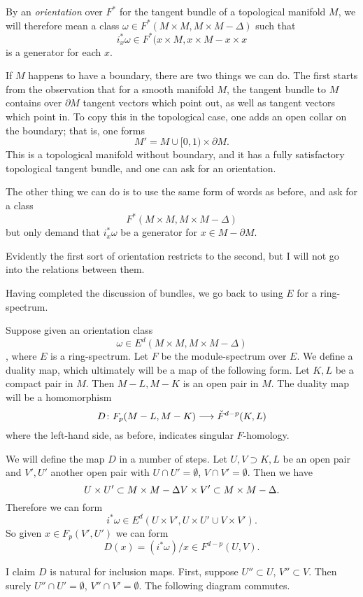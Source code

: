 \documentclass[../main]{subfiles}
\begin{document}
By an \emph{orientation} over $F^*$ for the tangent bundle of a topological manifold $M$, we will therefore mean a class $\omega \in F^*(M \times M, M \times M - \Delta)$ such that
\[i_x^* \omega \in F^*(x \times M, x \times M - x \times x\]
is a generator for each $x$. 

If $M$ happens to have a boundary, there are two things we can do. The first starts from the observation that for a smooth manifold $M$, the tangent bundle to $M$ contains over $\partial M$ tangent vectors which point out, as well as tangent vectors which point in. To copy this in the topological case, one adds an open collar on the boundary; that is, one forms
\[M' = M \cup [0,1) \times \partial M.\]
This is a topological manifold without boundary, and it has a fully satisfactory topological tangent bundle, and one can ask for an orientation.

The other thing we can do is to use the same form of words as before, and ask for a class
\[F^*(M \times M, M \times M - \Delta)\]
but only demand that $i_x^* \omega$ be a generator for $x \in M - \partial M$.

Evidently the first sort of orientation restricts to the second, but I will not go into the relations between them.

Having completed the discussion of bundles, we go back to using $E$ for a ring-spectrum.

Suppose given an orientation class
\[\omega \in E^d(M \times M, M \times M - \Delta)\],
where $E$ is a ring-spectrum. Let $F$ be the module-spectrum over $E$. We define a duality map, which ultimately will be a map of the following form. Let $K,L$ be a compact pair in $M$. Then $M-L,M-K$ is an open pair in $M$. The duality map will be a homomorphism
\[D \colon F_p(M-L,M-K) \longrightarrow \check{F}^{d-p}(K,L)\]
where the left-hand side, as before, indicates singular $F$-homology.

We will define the map $D$ in a number of steps. Let $U,V \supset K,L$ be an open pair and $V',U'$ another open pair with $U \cap U' = \emptyset$, $V \cap V' = \emptyset$. Then we have
\[U \times U' \subset M \times M - \Delta \\
V \times V' \subset M \times M - \Delta.\]
Therefore we can form
\[i^* \omega \in E^d(U \times V', U \times U' \cup V \times V').\]
So given $x \in F_p(V',U')$ we can form
\[D(x) = (i^* \omega)/x \in F^{d-p}(U,V).\]

I claim $D$ is natural for inclusion maps. First, suppose $U'' \subset U$, $V'' \subset V$. Then surely $U'' \cap U' = \emptyset$, $V'' \cap V' = \emptyset$. The following diagram commutes.
\end{document}
